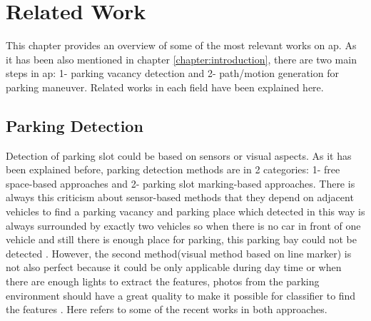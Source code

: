 
\chapter{Related Work}\label{chapter:related_wrok}
This chapter provides an overview of some of the most relevant works on \acrfull{ap}. As it has been also mentioned in chapter \ref{chapter:introduction}, there are two main steps in \acrshort{ap}: 1- parking vacancy detection and 2- path/motion generation for parking maneuver. Related works in each field have been explained here.
\section{Parking Detection}
Detection of parking slot could be based on sensors or visual aspects. As it has been explained before, parking detection methods are in 2 categories: 1- free space-based approaches and 2- parking slot marking-based approaches. There is always this criticism about sensor-based methods that they depend on adjacent vehicles to find a parking vacancy and parking place which detected in this way is always surrounded by exactly two vehicles so when there is no car in front of one vehicle and still there is enough place for parking, this parking bay could not be detected \cite{visual-parking-slot}. However, the second method(visual method based on line marker) is not also perfect because it could be only applicable during day time or when there are enough lights to extract the features, photos from the parking environment should have a great quality to make it possible for classifier to find the features \cite{Laser-radar-based}. Here refers to some of the recent works in both approaches.
